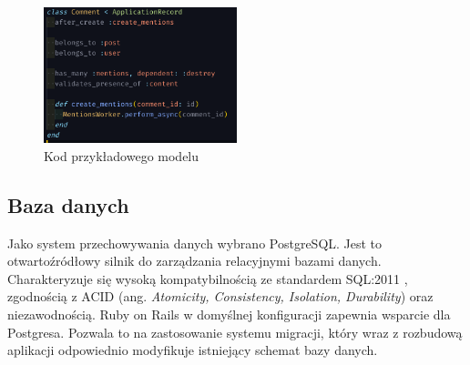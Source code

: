 \documentclass[declaration,shortabstract,polish,inz]{iithesis}
\begin{document}
\begin{figure}
    \centering
    \includegraphics[width=0.5\textwidth]{images/comment_model.png}
    \caption{Kod przykładowego modelu}
    \label{fig:model}
\end{figure}


\subsection{Baza danych}
Jako system przechowywania danych wybrano PostgreSQL. Jest to otwartoźródłowy silnik do zarządzania relacyjnymi bazami danych. Charakteryzuje się wysoką kompatybilnością ze standardem SQL:2011 \cite{sql2011}, zgodnością z ACID \cite{acid} (ang. \textit{Atomicity, Consistency, Isolation, Durability}) oraz niezawodnością. Ruby on Rails w domyślnej konfiguracji zapewnia wsparcie dla Postgresa. Pozwala to na zastosowanie systemu migracji, który wraz z rozbudową aplikacji odpowiednio modyfikuje istniejący schemat bazy danych.
\end{document}
